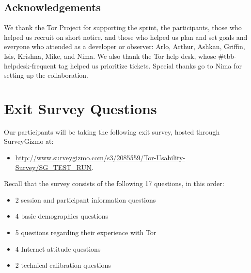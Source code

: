\documentclass[letterpaper,twocolumn,11pt]{article}
\begin{document}
\subsection{Acknowledgements}
\indent \indent We thank the Tor Project for supporting the sprint, the participants, those who helped us recruit on short notice, and those who helped us plan and set goals and everyone who attended as a developer or observer: Arlo, Arthur, Ashkan, Griffin, Isis, Krishna, Mike, and Nima. We also thank the Tor help desk, whose \#tbb-helpdesk-frequent tag helped us prioritize tickets. Special thanks go to Nima for setting up the collaboration.

\section{Exit Survey Questions}
\label{sec:survey} 
\indent \indent Our participants will be taking the following exit survey, hosted through
SurveyGizmo at: 
\begin{itemize} \itemsep1pt \parskip0pt 
\item \url{http://www.surveygizmo.com/s3/2085559/Tor-Usability-Survey/SG_TEST_RUN}.
\end{itemize}

\noindent Recall that the survey consists of the following 17 questions, in this order: 
\begin{itemize} \itemsep1pt \parskip0pt 
\item 2 session and participant information questions
\item 4 basic demographics questions
\item 5 questions regarding their experience with Tor
\item 4 Internet attitude questions
\item 2 technical calibration questions
\end{itemize}
\end{document}
